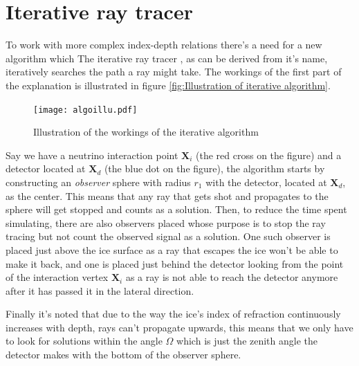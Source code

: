 \section{Iterative ray tracer}
\label{sec:Iterative}
To work with more complex index-depth relations there's a need for a
new algorithm which 
The iterative ray tracer \cite{2022icrc.confE1027O}, as can be derived from
it's name, iteratively searches the path a ray might take. The workings of the
first part of the explanation is illustrated in figure \ref{fig:Illustration of
iterative algorithm}.  
\begin{figure}
  \centering
  \texttt{[image: algoillu.pdf]}
  \caption{Illustration of the workings of the iterative algorithm}
  \label{fig:Illustration of iterative algorithm}
\end{figure}
Say we have a neutrino interaction point $\mathbf{X}_i$
(the red cross on the figure) and a detector located at $\mathbf{X}_d$ (the
blue dot on the figure), the algorithm starts by constructing an
\textit{observer} sphere with radius $r_1$ with the detector, located at $\mathbf{X}_d$, as the
center.  This means that any ray that gets shot and propagates to the sphere
will get stopped and counts as a solution.  Then, to reduce the time spent simulating, there are also observers placed
whose purpose is to stop the ray tracing but not count the observed signal as a solution.
One such observer is placed 
just above the ice surface as a ray that escapes the ice won't be able to make it back, and one
is placed just behind the detector looking from the point of the interaction vertex $\mathbf{X}_i$ as
a ray is not able to reach the detector anymore after it has passed it in the
lateral direction. 

Finally it's noted that due to the way the ice's index of refraction
continuously increases with depth, rays can't propagate upwards, this means that we only 
have to look for solutions within the angle $\Omega$ which is just the zenith angle the detector
makes with the bottom of the observer sphere.


